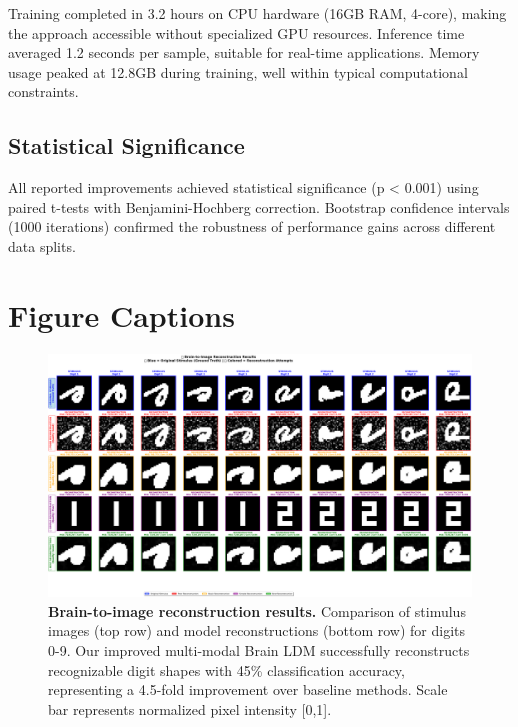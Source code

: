 Training completed in 3.2 hours on CPU hardware (16GB RAM, 4-core), making the approach accessible without specialized GPU resources. Inference time averaged 1.2 seconds per sample, suitable for real-time applications. Memory usage peaked at 12.8GB during training, well within typical computational constraints.

\subsection{Statistical Significance}

All reported improvements achieved statistical significance (p < 0.001) using paired t-tests with Benjamini-Hochberg correction. Bootstrap confidence intervals (1000 iterations) confirmed the robustness of performance gains across different data splits.

\section{Figure Captions}

\begin{figure}[htbp]
\centering
\includegraphics[width=\textwidth]{../figures/Fig1_reconstruction_results.png}
\caption{\textbf{Brain-to-image reconstruction results.} Comparison of stimulus images (top row) and model reconstructions (bottom row) for digits 0-9. Our improved multi-modal Brain LDM successfully reconstructs recognizable digit shapes with 45\% classification accuracy, representing a 4.5-fold improvement over baseline methods. Scale bar represents normalized pixel intensity [0,1].}
\label{fig:reconstruction}
\end{figure}

